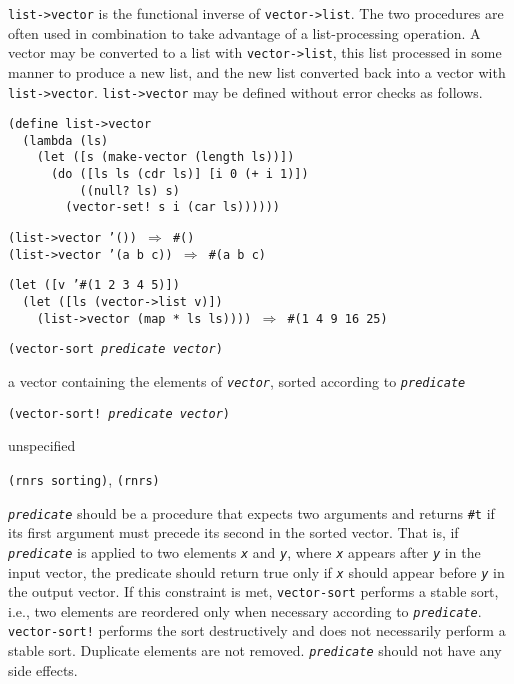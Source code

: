 \texttt{list-\textgreater{}vector} is the functional inverse of \texttt{vector-\textgreater{}list}.
The two procedures are often used in combination
to take advantage of a list-processing operation.
A vector may be converted to a list with \texttt{vector-\textgreater{}list}, this list
processed in some manner to produce a new list, and the new list
converted back into a vector with \texttt{list-\textgreater{}vector}.
\texttt{list-\textgreater{}vector} may be defined without error checks as follows.

\begin{alltt}
(define list-\textgreater{}vector
  (lambda (ls)
    (let ([s (make-vector (length ls))])
      (do ([ls ls (cdr ls)] [i 0 (+ i 1)])
          ((null? ls) s)
        (vector-set! s i (car ls))))))

(list-\textgreater{}vector '()) \(\Rightarrow\) \#{}()
(list-\textgreater{}vector '(a b c)) \(\Rightarrow\) \#{}(a b c)

(let ([v '\#{}(1 2 3 4 5)])
  (let ([ls (vector-\textgreater{}list v)])
    (list-\textgreater{}vector (map * ls ls)))) \(\Rightarrow\) \#{}(1 4 9 16 25)
\end{alltt}

\begin{description}

\label{objects_s239}\item[procedure] \texttt{(vector-sort \textit{predicate} \textit{vector})}



\item[returns] a vector containing the elements of \texttt{\textit{vector}}, sorted according to \texttt{\textit{predicate}}


\item[procedure] \texttt{(vector-sort! \textit{predicate} \textit{vector})}



\item[returns] unspecified


\item[libraries] \texttt{(rnrs sorting)}, \texttt{(rnrs)}
\end{description}

\texttt{\textit{predicate}} should be a procedure that expects two arguments and
returns \texttt{\#{}t} if its first argument must precede its second in
the sorted vector.
That is, if \texttt{\textit{predicate}} is applied to two elements \texttt{\textit{x}} and
\texttt{\textit{y}}, where \texttt{\textit{x}} appears after \texttt{\textit{y}} in the input vector,
the predicate should return true only if
\texttt{\textit{x}} should appear before \texttt{\textit{y}}
in the output vector.
If this constraint is met,
\texttt{vector-sort} performs a stable sort, i.e., two elements are
reordered only when necessary according to \texttt{\textit{predicate}}.
\texttt{vector-sort!} performs the sort destructively and
does not necessarily perform a stable sort.
Duplicate elements are not removed.
\texttt{\textit{predicate}} should not have any side effects.

